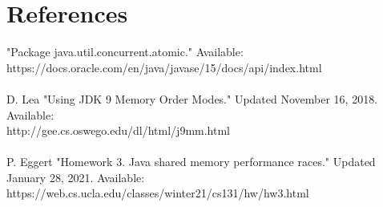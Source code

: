 \section{References}
"Package java.util.concurrent.atomic." 
Available: \\ https://docs.oracle.com/en/java/javase/15/docs/api/index.html \\
\\
D. Lea "Using JDK 9 Memory Order Modes." 
Updated November 16, 2018.
Available: \\ http://gee.cs.oswego.edu/dl/html/j9mm.html \\
\\
P. Eggert "Homework 3. Java shared memory performance races." 
Updated January 28, 2021. 
Available: \\ https://web.cs.ucla.edu/classes/winter21/cs131/hw/hw3.html




